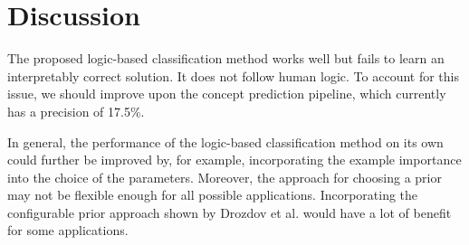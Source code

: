 \section{Discussion}

The proposed logic-based classification method works well but fails to learn an interpretably correct solution. It does not follow human logic.
To account for this issue, we should improve upon the concept prediction pipeline, which currently has a precision of 17.5\%.

In general, the performance of the logic-based classification method on its own could further be improved by, for example, incorporating the example importance into the choice of the parameters.
Moreover, the approach for choosing a prior may not be flexible enough for all possible applications.
Incorporating the configurable prior approach shown by Drozdov et al. \cite{RefWorks:RefID:67-drozdov2021online} would have a lot of benefit for some applications.

